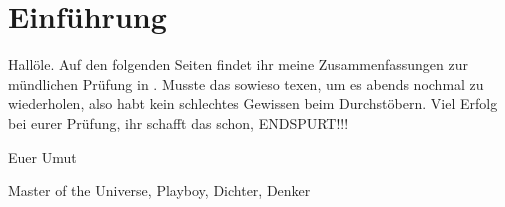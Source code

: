 \chapter{Einführung}
Hallöle.
Auf den folgenden Seiten findet ihr meine Zusammenfassungen zur mündlichen Prüfung in \whichprep.
Musste das sowieso texen, um es abends nochmal zu wiederholen, also habt kein schlechtes Gewissen beim Durchstöbern.
Viel Erfolg bei eurer Prüfung, ihr schafft das schon, ENDSPURT!!!

Euer Umut
\par
Master of the Universe, Playboy, Dichter, Denker
